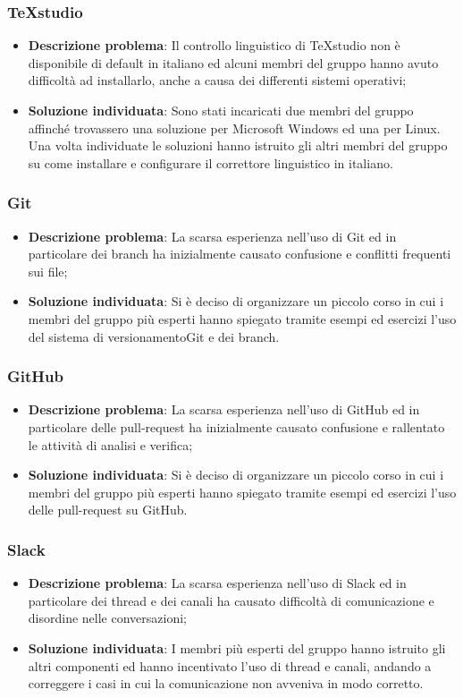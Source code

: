 	\subsubsection{TeXstudio}
		\begin{itemize}
			\item \textbf{Descrizione problema}: Il controllo linguistico di TeXstudio non è disponibile di default in italiano ed alcuni membri del gruppo hanno avuto difficoltà ad installarlo, anche a causa dei differenti sistemi operativi;
			\item \textbf{Soluzione individuata}: Sono stati incaricati due membri del gruppo affinché trovassero una soluzione per Microsoft Windows ed una per Linux. Una volta individuate le soluzioni hanno istruito gli altri membri del gruppo su come installare e configurare il correttore linguistico in italiano.
		\end{itemize}
	\subsubsection{Git}
		\begin{itemize}
			\item \textbf{Descrizione problema}: La scarsa esperienza nell'uso di Git ed in particolare dei branch ha inizialmente causato confusione e conflitti frequenti sui file;
			\item \textbf{Soluzione individuata}: Si è deciso di organizzare un piccolo corso in cui i membri del gruppo più esperti hanno spiegato tramite esempi ed esercizi l'uso del sistema di versionamento\glosp Git e dei branch. 
		\end{itemize}
	\subsubsection{GitHub}
		\begin{itemize}
		\item \textbf{Descrizione problema}: La scarsa esperienza nell'uso di GitHub ed in particolare delle pull-request ha inizialmente causato confusione e rallentato le attività di analisi e verifica;
		\item \textbf{Soluzione individuata}: Si è deciso di organizzare un piccolo corso in cui i membri del gruppo più esperti hanno spiegato tramite esempi ed esercizi l'uso delle pull-request su GitHub. 
		\end{itemize}
	\subsubsection{Slack}
		\begin{itemize}
			\item \textbf{Descrizione problema}: La scarsa esperienza nell'uso di Slack ed in particolare dei thread e dei canali ha causato difficoltà di comunicazione e disordine nelle conversazioni;
			\item \textbf{Soluzione individuata}: I membri più esperti del gruppo hanno istruito gli altri componenti ed hanno incentivato l'uso di thread e canali, andando a correggere i casi in cui la comunicazione non avveniva in modo corretto. 
		\end{itemize}